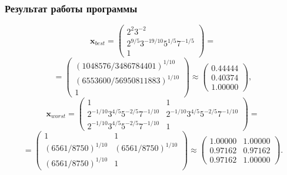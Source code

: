 \documentclass[ucs, notheorems, handout]{beamer}
\begin{document}
\begin{frame}
    \frametitle{Результат работы программы}

$$\bm{x}_{best} =
\begin{pmatrix}
2^{2} 3^{-2}\\
2^{9/5} 3^{-19/10} 5^{1/5} 7^{-1/5}\\
1
\end{pmatrix} =$$
$$ = \begin{pmatrix}
(1048576/3486784401)^{1/10}\\
(6553600/56950811883)^{1/10}\\
1
\end{pmatrix} \approx
\begin{pmatrix}
0.44444\\
0.40374\\
1.00000
\end{pmatrix},
$$
$$\bm{x}_{worst} =
\begin{pmatrix}
1 & 1\\
2^{-1/10} 3^{4/5} 5^{-2/5} 7^{-1/10} & 2^{-1/10} 3^{4/5} 5^{-2/5} 7^{-1/10}\\
2^{-1/10} 3^{4/5} 5^{-2/5} 7^{-1/10} & 1
\end{pmatrix} =$$
$$ = \begin{pmatrix}
1 & 1\\
(6561/8750)^{1/10} & (6561/8750)^{1/10}\\
(6561/8750)^{1/10} & 1
\end{pmatrix} \approx
\begin{pmatrix}
1.00000 & 1.00000\\
0.97162 & 0.97162\\
0.97162 & 1.00000
\end{pmatrix}.
$$
    
\end{frame}
\end{document}
